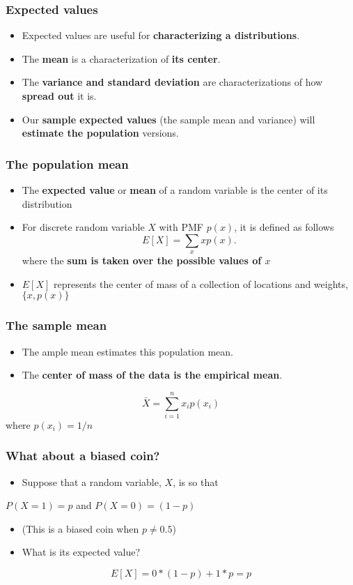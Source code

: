 \documentclass[10pt,article]{article}
\begin{document}
\subsubsection{Expected values}
\label{sec:org579d420}
\begin{itemize}
\item Expected values are useful for \textbf{characterizing a distributions}.
\item The \textbf{mean} is a characterization of \textbf{its center}.
\item The \textbf{variance and standard deviation} are characterizations of how \textbf{spread out} it is.
\item Our \textbf{sample expected values} (the sample mean and variance) will \textbf{estimate the population} versions.
\end{itemize}

\subsubsection{The population mean}
\label{sec:org50655fb}
\begin{itemize}
\item The \textbf{\textbf{expected value}} or \textbf{\textbf{mean}} of a random variable is the center of its distribution
\item For {\color{green}discrete random variable \(X\) with PMF \(p(x)\)}, it is defined as follows
$$
    E[X] = \sum_x xp(x).
    $$
where the \textbf{sum is taken over the possible values of \(x\)}
\item {\color{green}\(E[X]\) represents the center of mass} of a collection of {\color{green}locations and weights, \(\{x, p(x)\}\)}
\end{itemize}

\subsubsection{The sample mean}
\label{sec:org5892df1}
\begin{itemize}
\item The {\color{green}ample mean estimates this population mean}.
\item The \textbf{center of mass of the data is the empirical mean}.
\end{itemize}
$$
\bar X = \sum_{i=1}^n x_i p(x_i)
$$
where \(p(x_i) = 1/n\)

\subsubsection{What about a biased coin?}
\label{sec:org73b8c72}
\begin{itemize}
\item Suppose that a random variable, \(X\), is so that
\end{itemize}
\(P(X=1) = p\) and \(P(X=0) = (1 - p)\)
\begin{itemize}
\item (This is a biased coin when \(p\neq 0.5\))
\item What is its expected value?
\end{itemize}
$$
E[X] = 0 * (1 - p) + 1 * p = p
$$
\end{document}
